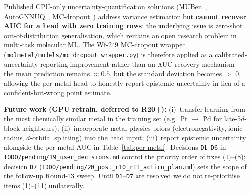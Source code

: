 Published CPU-only uncertainty-quantification solutions
(MUBen~\cite{li2023muben}, AutoGNNUQ~\cite{jiang2024autognnuq},
MC-dropout~\cite{liu2024mc}) address variance estimation but
\textbf{cannot recover AUC for a head with zero training rows}:
the underlying issue is zero-shot out-of-distribution
generalisation, which remains an open research problem in
multi-task molecular ML. The Wf-249 MC-dropout wrapper
(\texttt{molmetal/models/mc\_dropout\_wrapper.py}) is therefore
applied as a calibrated-uncertainty reporting improvement
rather than an AUC-recovery mechanism --- the mean prediction
remains $\approx 0.5$, but the standard deviation becomes
$>$ 0, allowing the per-metal head to honestly report
epistemic uncertainty in lieu of a confident-but-wrong point
estimate.

\textbf{Future work (GPU retrain, deferred to R20+):}
(i)~transfer learning from the most chemically similar metal
in the training set (e.g.\ Pt $\to$ Pd for late-5$d$-block
neighbours); (ii)~incorporate metal-physics priors
(electronegativity, ionic radius, $d$-orbital splitting) into
the head input; (iii)~report epistemic uncertainty alongside
the per-metal AUC in Table~\ref{tab:per-metal}.
Decisions \texttt{D1}--\texttt{D6} in \texttt{TODO/pending/19\_user\_decisions.md}
control the priority order of fixes (1)--(8); decision \texttt{D7}
(\texttt{TODO/pending/20\_post\_r10\_r11\_action\_plan.md}) sets the
scope of the follow-up Round-13 sweep. Until \texttt{D1}--\texttt{D7}
are resolved we do not re-prioritise items (1)--(11) unilaterally.


